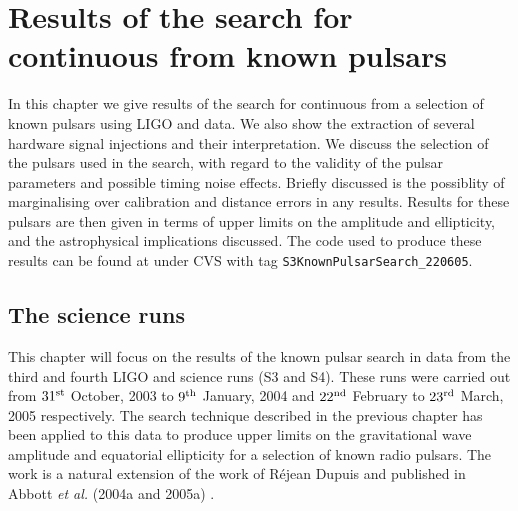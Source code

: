 

\chapter{Results of the search for continuous \gws from known pulsars}\label{Chapter3}
In this chapter we give results of the search for continuous \gws from a selection of known
pulsars using LIGO and \geo data. We also show the extraction of several hardware signal injections
and their interpretation. We discuss the selection of the pulsars used in the search, with regard to
the validity of the pulsar parameters and possible timing noise effects. Briefly discussed is the
possiblity of marginalising over calibration and distance errors in any results. Results for these
pulsars are then given in terms of upper limits on the \gw amplitude and ellipticity, and the
astrophysical implications discussed. The code used to produce these results can be found at
\cite{LALapps} under CVS with tag \verb+S3KnownPulsarSearch_220605+.

\section{The science runs}
This chapter will focus on the results of the known pulsar search in data from the third and fourth
LIGO and \geo science runs (S3 and S4). These runs were carried out from $31^{\rm st}$ October,
2003 to $9^{\rm th}$ January, 2004 and $22^{\rm nd}$ February to $23^{\rm rd}$ March, 2005
respectively. The search technique described in the previous chapter has been applied to this data
to produce upper limits on the gravitational wave amplitude and equatorial ellipticity for a
selection of known radio pulsars. The work is a natural extension of the work of R\'ejean Dupuis
\cite{Dupuis:2004} and published in Abbott {\it et al.} (2004a and 2005a) 
\cite{Abbott:2004, Abbott:2005}.

